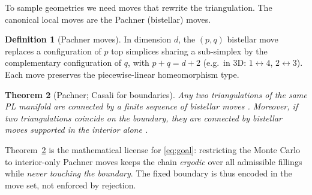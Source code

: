 \documentclass[11pt]{article}
\theoremstyle{definition}
\newtheorem{definition}{Definition}[section]
\theoremstyle{plain}
\newtheorem{theorem}[definition]{Theorem}
\begin{document}
To sample geometries we need moves that rewrite the triangulation. The canonical local
moves are the Pachner (bistellar) moves.

\begin{definition}[Pachner moves]
In dimension $d$, the $(p,q)$ bistellar move replaces a configuration of $p$ top simplices
sharing a sub-simplex by the complementary configuration of $q$, with $p+q=d+2$ (e.g.\ in
$3$D: $1\!\leftrightarrow\!4$, $2\!\leftrightarrow\!3$). Each move preserves the
piecewise-linear homeomorphism type.
\end{definition}

\begin{theorem}[Pachner; Casali for boundaries]
\label{thm:pachner}
Any two triangulations of the same PL manifold are connected by a finite sequence of
bistellar moves \cite{pachner1991}. Moreover, if two triangulations \emph{coincide on the
boundary}, they are connected by bistellar moves supported in the \emph{interior} alone
\cite{casali1995}.
\end{theorem}

Theorem~\ref{thm:pachner} is the mathematical license for \eqref{eq:goal}: restricting the
Monte Carlo to interior-only Pachner moves keeps the chain \emph{ergodic} over all admissible
fillings while \emph{never touching the boundary}. The fixed boundary is thus encoded in the
move set, not enforced by rejection.
\end{document}
